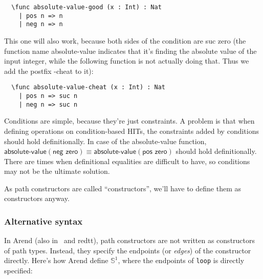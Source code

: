 \begin{verbatim}
  \func absolute-value-good (x : Int) : Nat
    | pos n => n
    | neg n => n
\end{verbatim}

This one will also work, because both sides of the condition
are \textsf{suc zero}
(the function name \textsf{absolute-value} indicates that it's finding
the absolute value of the input integer, while the following function
is not actually doing that.
Thus we add the postfix \textsf{-cheat} to it):

\begin{verbatim}
  \func absolute-value-cheat (x : Int) : Nat
    | pos n => suc n
    | neg n => suc n
\end{verbatim}


Conditions are simple, because they're just constraints.
A problem is that when defining operations on condition-based HITs,
the constraints added by conditions should hold definitionally.
In case of the \textsf{absolute-value} function,
$\textsf{absolute-value}(\textsf{neg zero}) \equiv
\textsf{absolute-value}(\textsf{pos zero})$ should hold definitionally.
There are times when definitional equalities are difficult to have,
so conditions may not be the ultimate solution.

As path constructors are called ``constructors'',
we'll have to define them as constructors anyway.




\subsubsection{Alternative syntax}

In Arend (also in \RedPRL~and redtt),
path constructors are not written as constructors of path types.
Instead, they specify the endpoints (or \textit{edges})
of the constructor directly.
Here's how Arend define $\mathbb{S}^1$,
where the endpoints of \texttt{loop} is directly specified:

